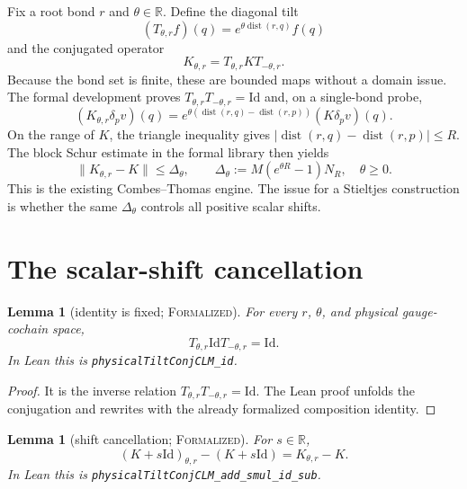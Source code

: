 \documentclass[11pt]{article}
\newtheorem{lemma}[theorem]{Lemma}
\theoremstyle{definition}
\newcommand{\R}{\mathbb{R}}
\newcommand{\Id}{\mathrm{Id}}
\newcommand{\dist}{\operatorname{dist}}
\newcommand{\norm}[1]{\lVert #1\rVert}
\newcommand{\lean}[1]{\texttt{#1}}
\newcommand{\formalized}{\textsc{Formalized}}
\begin{document}
Fix a root bond $r$ and $\theta\in\R$.  Define the diagonal tilt
\begin{equation}\label{eq:tilt}
  (T_{\theta,r}f)(q)=e^{\theta\dist(r,q)}f(q)
\end{equation}
and the conjugated operator
\begin{equation}\label{eq:conj}
  K_{\theta,r}=T_{\theta,r}KT_{-\theta,r}.
\end{equation}
Because the bond set is finite, these are bounded maps without a domain issue.
The formal development proves $T_{\theta,r}T_{-\theta,r}=\Id$ and, on a
single-bond probe,
\begin{equation}\label{eq:entry}
 (K_{\theta,r}\delta_pv)(q)
 =e^{\theta(\dist(r,q)-\dist(r,p))}(K\delta_pv)(q).
\end{equation}
On the range of $K$, the triangle inequality gives
$|\dist(r,q)-\dist(r,p)|\le R$.  The block Schur estimate in the formal
library then yields
\begin{equation}\label{eq:defect}
 \norm{K_{\theta,r}-K}
 \le \Delta_\theta,
 \qquad
 \Delta_\theta:=M(e^{\theta R}-1)N_R,
 \quad \theta\ge0.
\end{equation}
This is the existing Combes--Thomas engine.  The issue for a Stieltjes
construction is whether the same $\Delta_\theta$ controls all positive scalar
shifts.

\section{The scalar-shift cancellation}\label{sec:cancellation}

\begin{lemma}[identity is fixed; \formalized]\label{lem:id}
For every $r$, $\theta$, and physical gauge-cochain space,
\[
  T_{\theta,r}\Id T_{-\theta,r}=\Id.
\]
In Lean this is \lean{physicalTiltConjCLM\_id}.
\end{lemma}

\begin{proof}
It is the inverse relation $T_{\theta,r}T_{-\theta,r}=\Id$.  The Lean proof
unfolds the conjugation and rewrites with the already formalized composition
identity.
\end{proof}

\begin{lemma}[shift cancellation; \formalized]\label{lem:cancel}
For $s\in\R$,
\begin{equation}\label{eq:cancel}
  (K+s\Id)_{\theta,r}-(K+s\Id)=K_{\theta,r}-K.
\end{equation}
In Lean this is
\lean{physicalTiltConjCLM\_add\_smul\_id\_sub}.
\end{lemma}
\end{document}
